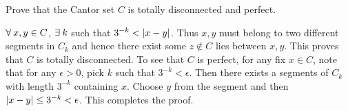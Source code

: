 \begin{exercise}
    Prove that the Cantor set $C$ is totally disconnected and 
    perfect.
\end{exercise}
\begin{pf}
    $\forall\: x,y\in C$, $\exists\: k$ such that $3^{-k}<\left\lvert {x-y} \right\rvert$. 
    Thus $x,y$ must belong to two different segments in $C_k$ 
    and hence there exist some $z\not\in C$ lies between $x,y$. 
    This proves that $C$ is totally disconnected. To see that 
    $C$ is perfect, for any fix $x\in C$, note that for any 
    $\epsilon>0$, pick $k$ such that $3^{-k}<\epsilon$. Then 
    there exists a segments of $C_k$ with length $3^{-k}$ 
    containing $x$. Choose $y$ from the segment and then 
    $\left\lvert {x-y} \right\rvert\leq 3^{-k}<\epsilon$. This completes the proof.
\end{pf}

